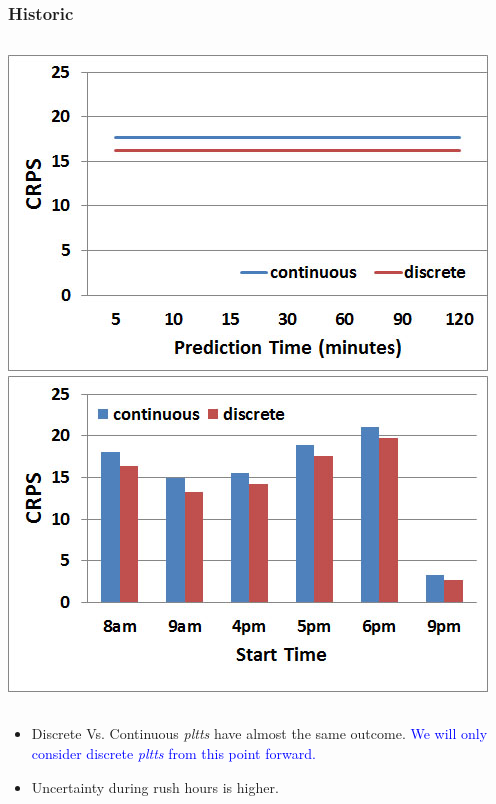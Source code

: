 \documentclass[t]{beamer}
\begin{document}
\begin{frame}\frametitle{Historic}
\vspace{0.5in}
\begin{columns}
		\includegraphics[scale=0.3]{Links_Historic.jpg}
		\includegraphics[scale=0.3]{Links_Historic_TOD.jpg}
\end{columns}
\begin{itemize}
\item Discrete Vs. Continuous \emph{pltts} have almost the same outcome. \textcolor{blue}{We will only consider discrete \emph{pltts} from this point forward.}
\item Uncertainty during rush hours is higher.
\end{itemize}
\end{frame}
\end{document}
